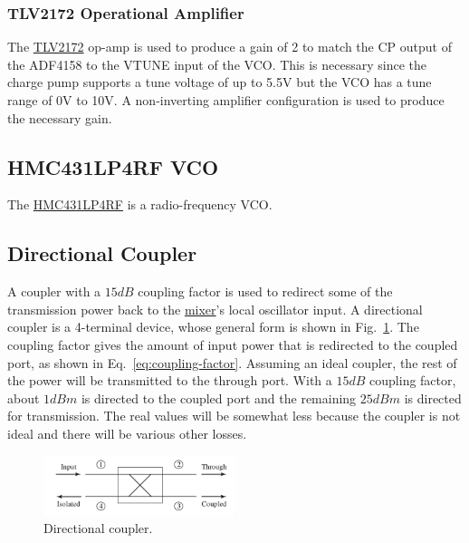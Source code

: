 \subsubsection{TLV2172 Operational Amplifier}
\label{sec:tlv2172-op-amp}

The \href{http://www.ti.com/lit/ds/symlink/tlv172.pdf}{TLV2172} op-amp is used to produce a gain of
2 to match the CP output of the ADF4158 to the VTUNE input of the VCO. This is necessary since the
charge pump supports a tune voltage of up to 5.5V but the VCO has a tune range of 0V to 10V. A
non-inverting amplifier configuration is used to produce the necessary gain.

\subsection{HMC431LP4RF VCO}
\label{sec:hmc431lp4rf}

The
\href{http://www.analog.com/media/en/technical_documentation/data_sheets/hmc431.pdf}{HMC431LP4RF} is
a radio-frequency VCO\@.

\subsection{Directional Coupler}
\label{sec:directional-coupler}

A coupler with a $15 \si{dB}$ coupling factor is used to redirect some of the transmission power
back to the \hyperref[sec:adl5802]{mixer}'s local oscillator input. A directional coupler is a
4-terminal device, whose general form is shown in Fig.~\ref{fig:directional-coupler}. The coupling
factor gives the amount of input power that is redirected to the coupled port, as shown in
Eq.~\ref{eq:coupling-factor}. Assuming an ideal coupler, the rest of the power will be transmitted
to the through port. With a $15 \si{dB}$ coupling factor, about $1 \si{dBm}$ is directed to the
coupled port and the remaining $25 \si{dBm}$ is directed for transmission. The real values will be
somewhat less because the coupler is not ideal and there will be various other losses.

\begin{figure}[h]
        \centering
        \includegraphics[width=0.5\textwidth]{data/directional-coupler}
        \caption{Directional coupler.}
        \label{fig:directional-coupler}
\end{figure}


